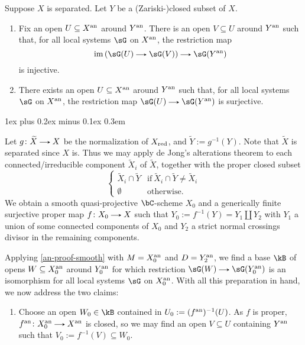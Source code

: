 \documentclass[11pt,leqno]{article}
\makeatletter
\newcommand{\thmheadfont}{\scshape}
\newcommand{\thmhorizspace}{0.3em}
\newcommand{\thmsep}{\hspace{\thmhorizspace}---}
\renewenvironment{proof}[1][Proof]{\par
  \pushQED{\qed}%
  \normalfont%
  \topsep1ex plus 0.2ex minus 0.1ex\relax%
  \labelsep \thmhorizspace\relax%
  \trivlist
  \item[\hskip\labelsep\thmheadfont#1\@addpunct{\thmsep}]\ignorespaces
}{%
  \popQED\endtrivlist\@endpefalse%
}
\theoremstyle{block}
\numberwithin{subblock}{block}
\numberwithin{equation}{subblock}
\newcommand{\arrlen}{1.25em}
\renewcommand{\to}{\mathrel{\tikz[baseline]%
    \draw[>=stealth,->](0,0.5ex)--(\arrlen,0.5ex);}}
\renewcommand{\l}{\left}
\renewcommand{\r}{\right}
\newcommand{\til}{\widetilde}
\renewcommand{\c}{\colon}
\newcommand{\ce}{\mathrel{:=}}%
\renewcommand{\im}{\operatorname{im}}
\numberwithin{block}{section}
\makeatother
\begin{document}
\begin{nothing}
  \begin{sublemma}
    \label{an-proof-alter}
    Suppose $X$ is separated. Let $Y$ be a (Zariski-)closed subset of $X$.
    \begin{enumerate}
    \item \label{an-proof-alter-inj}
      Fix an open $U \subseteq X^{\mathrm{an}}$ around $Y^{\mathrm{an}}$. There is an open $V \subseteq U$ around $Y^{\mathrm{an}}$ such that, for all local systems $\sG$ on $X^{\mathrm{an}}$, the restriction map
      \[
        \im\l(\sG(U) \to \sG(V)\r) \to \sG(Y^\an)
      \]
      is injective.
    \item \label{an-proof-alter-surj}
      There exists an open $U \subseteq X^{\mathrm{an}}$ around $Y^{\mathrm{an}}$ such that, for all local systems $\sG$ on $X^{\mathrm{an}}$, the restriction map $\sG(U) \to \sG(Y^\an)$ is surjective.
    \end{enumerate}
    
    \begin{proof}
      Let $g \c \til{X} \to X$ be the normalization of $X_{\mathrm{red}}$, and $\til{Y} \ce g^{-1}(Y)$. Note that $\til{X}$ is separated since $X$ is. Thus we may apply de Jong's alterations theorem to each connected/irreducible component $\til{X}_i$ of $\til{X}$, together with the proper closed subset
      \[
        \begin{cases}
          \til{X}_i \cap \til{Y} & \text{if}\ \til{X}_i \cap \til{Y} \ne \til{X}_i \\
          \emptyset & \text{otherwise}.
        \end{cases}
      \]
      We obtain a smooth quasi-projective $\bC$-scheme $X_0$ and a generically finite surjective proper map $f \c X_0 \to X$ such that $Y_0 \ce f^{-1}(Y) = Y_1 \amalg Y_2$ with $Y_1$ a union of some connected components of $X_0$ and $Y_2$ a strict normal crossings divisor in the remaining components.

      Applying \cref{an-proof-smooth} with $M = X_0^{\mathrm{an}}$ and $D = Y_2^{\mathrm{an}}$, we find a base $\kB$ of opens $W \subseteq X_0^{\mathrm{an}}$ around $Y_0^{\mathrm{an}}$ for which restriction $\sG(W) \to \sG(Y_0^\an)$ is an isomorphism for all local systems $\sG$ on $X_0^{\mathrm{an}}$. With all this preparation in hand, we now address the two claims:
      \begin{enumerate}[leftmargin=*]
      \item
        Choose an open $W_0 \in \kB$ contained in $U_0 \ce (f^\an)^{-1}(U)$. As $f$ is proper, $f^\an \c X_0^\an \to X^\an$ is closed, so we may find an open $V \subseteq U$ containing $Y^{\mathrm{an}}$ such that $V_0 \ce f^{-1}(V) \subseteq W_0$.


\end{enumerate}
\end{proof}
\end{sublemma}
\end{nothing}
\end{document}
